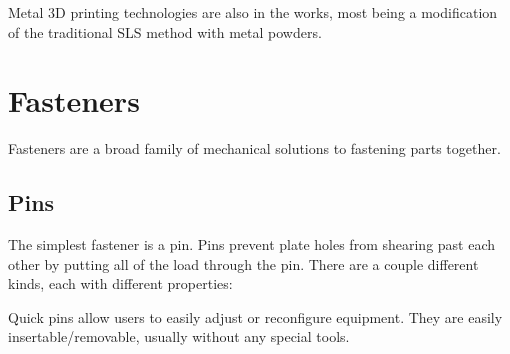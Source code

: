  	Metal 3D printing technologies are also in the works, most being a modification of the traditional SLS method with metal powders.
 		
	\section{Fasteners}
	Fasteners are a broad family of mechanical solutions to fastening parts together.
	
	\subsection{Pins}
	The simplest fastener is a pin. Pins prevent plate holes from shearing past each other by putting all of the load through the pin. There are a couple different kinds, each with different properties:
	
	Quick pins allow users to easily adjust or reconfigure equipment. They are easily insertable/removable, usually without any special tools.
	
